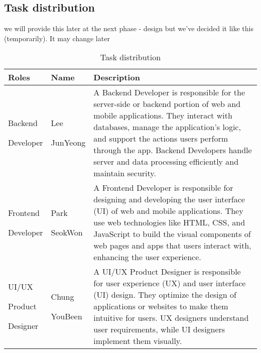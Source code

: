 \documentclass[conference]{IEEEtran}
\begin{document}
\subsection{Task distribution}
we will provide this later at the next phase - design
but we've decided it like this (temporarily). It may change later
\begin{table}[ht]
\caption{Task distribution}
\begin{tabular}{| p{1.7cm}|p{1.5cm}|p{4.3cm} |}

\hline
Roles & Name & Description\\
\hline
Backend  \par Developer
& Lee \par JunYeong 
& A Backend Developer is responsible for the server-side or backend portion of web and mobile applications. They interact with databases, manage the application's logic, and support the actions users perform through the app. Backend Developers handle server and data processing efficiently and maintain security. \\

\hline
Frontend \par Developer
& Park \par SeokWon 
& A Frontend Developer is responsible for designing and developing the user interface (UI) of web and mobile applications. They use web technologies like HTML, CSS, and JavaScript to build the visual components of web pages and apps that users interact with, enhancing the user experience. \\
\hline
UI/UX \par Product \par Designer
& Chung \par YouBeen 
& A UI/UX Product Designer is responsible for user experience (UX) and user interface (UI) design. They optimize the design of applications or websites to make them intuitive for users. UX designers understand user requirements, while UI designers implement them visually.
 \\
\hline
\end{tabular}
\end{table}
\end{document}

